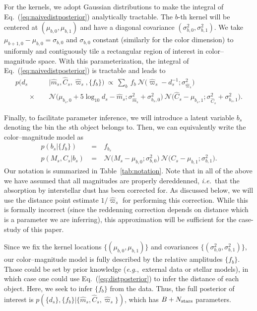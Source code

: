 \documentclass[manuscript, letterpaper]{aastex6}
\makeatletter
\let\origsubsection\subsection
\renewcommand\subsection{\@ifstar{\starsubsection}{\nostarsubsection}}
\newcommand\nostarsubsection[1]{\subsectionprelude\origsubsection{#1}}
\newcommand\starsubsection[1]{\subsectionprelude\origsubsection*{#1}}
\newcommand\subsectionprelude{\vspace{1em}}
\newcommand{\ie}{{\textit{i.e.}~}}
\newcommand{\eg}{{\textit{e.g.},~}}
\newcommand{\equref}[1]{{\xspace}Eq.~(\ref{#1})}
\newcommand{\eqn}[1]{\begin{eqnarray}#1\end{eqnarray}}
\newcommand{\nobj}{{N_{\rm stars}}}
\makeatother
\begin{document}
For the kernels, we adopt Gaussian distributions to make the integral of \equref{eq:naivedistposterior} analytically tractable.
The $b$-th kernel will be centered at $(\mu_{b,0}, \mu_{b,1})$ and have a diagonal covariance $(\sigma_{b,0}^2, \sigma_{b,1}^2)$.
We take $\mu_{b+1,0}-\mu_{b,0} = \sigma_{b,0}$ and $\sigma_{b,0}$ constant (similarly for the color dimension) to uniformly and contiguously tile a rectangular region of interest in color--magnitude space. 
With this parameterization, the integral of \equref{eq:naivedistposterior} is tractable and leads to
\eqn{
	p(d_s &&| \hat{m}_s, \hat{C}_s, \hat{\varpi}_s, \{ f_{b} \})  \ \propto  \ \sum_b\ f_b \ \mathcal{N}\bigl(\hat{\varpi}_s - d_s^{-1};\sigma_{\hat{\varpi}_s}^2 \bigr) \\ 
	 \quad\quad \times \ \ &&\mathcal{N}\bigl( \mu_{b_s,0} + 5\log_{10}d_s  -\hat{m}_s ;\sigma_{\hat{m}_s}^2 + \sigma_{b_s,0}^2 \bigr)   \ \mathcal{N}\bigl(\hat{C}_s - \mu_{b_s,1};\sigma_{\hat{C}_s}^2 + \sigma_{b_s,1}^2 \bigr). \label{eq:distposterior}\nonumber
}

Finally, to facilitate parameter inference, we will introduce a latent variable $b_s$ denoting the bin the $s$th object belongs to.
Then, we can equivalently write the color--magnitude model as
\eqn{
	p\left(b_s \bigr\rvert \bigl\{ f_b \bigr\}\right) \ &=& \ f_{b_s} \\ 
	p\left(M_s, C_s \bigr\rvert b_s \right) \ &=& \ \mathcal{N}\bigl(M_s - \mu_{b,0};\sigma_{b,0}^2 \bigr)  \ \mathcal{N}\bigl(C_s - \mu_{b,1};\sigma_{b,1}^2 \bigr).\nonumber
}
Our notation is summarized in Table~\ref{tab:notation}.
Note that in all of the above we have assumed that all magnitudes are properly dereddenned, \ie that the absorption by interstellar dust has been corrected for.
As discussed below, we will use the distance point estimate $1/\hat{\varpi}_s$ for performing this correction.
While this is formally incorrect (since the reddenning correction depends on distance which is a parameter we are inferring), this approximation will be sufficient for the case-study of this paper.


\subsection{Inference}

Since we fix the kernel locations $\{  (\mu_{b,0}, \mu_{b,1}) \}$ and covariances $\{(\sigma_{b,0}^2, \sigma_{b,1}^2)\}$, our color--magnitude model is fully described by the relative amplitudes $\{ f_{b} \}$. 
Those could be set by prior knowledge (\eg external data or stellar models), in which case one could use \equref{eq:distposterior} to infer the distance of each object.
Here, we seek to infer $\{ f_{b} \}$ from the data.
Thus, the full posterior of interest is $p(\{ d_s \}, \{ f_{b} \} | \{ \hat{m}_s, \hat{C}_s, \hat{\varpi}_s \})$, which has $B + \nobj$ parameters.
\end{document}
